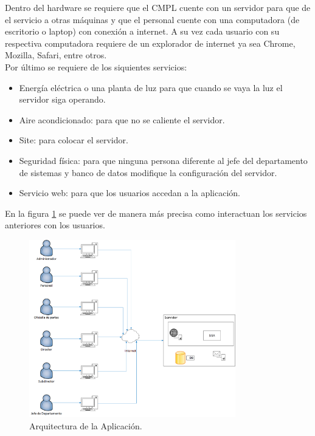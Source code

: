 Dentro del hardware se requiere que el CMPL cuente con un servidor para que de el servicio a otras máquinas y que el personal cuente con una computadora (de escritorio o laptop) con conexión a internet. A su vez cada usuario con su respectiva computadora requiere de un explorador de internet ya sea Chrome, Mozilla, Safari, entre otros.\\

Por último se requiere de los siquientes servicios: 
\begin{itemize}
	\item Energía eléctrica o una planta de luz para que cuando se vaya la luz el servidor siga operando.
	\item Aire acondicionado: para que no se caliente el servidor.
	\item Site: para colocar el servidor.
	\item Seguridad física: para que ninguna persona diferente al jefe del departamento de sistemas y banco de datos modifique la configuración del servidor.
	\item Servicio web: para que los usuarios accedan a la aplicación. 
\end{itemize} 

En la figura \ref{arquitectura} se puede ver de manera más precisa como interactuan los servicios anteriores con los usuarios.\\

	\begin{figure}[htbp!]
		\centering
			\includegraphics[width=0.8\textwidth]{images/propuesta/arquitectura}
		\caption{Arquitectura de la Aplicación.}
		\label{arquitectura}
	\end{figure}
	
